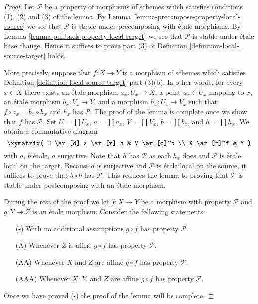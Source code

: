 \begin{proof}
Let $\mathcal{P}$ be a property of morphisms of schemes which
satisfies conditions (1), (2) and (3) of the lemma. By
Lemma \ref{lemma-precompose-property-local-source}
we see that $\mathcal{P}$ is stable under precomposing with
\'etale morphisms. By
Lemma \ref{lemma-pullback-property-local-target}
we see that $\mathcal{P}$ is stable under \'etale base change.
Hence it suffices to prove part (3) of
Definition \ref{definition-local-source-target}
holds.

\medskip\noindent
More precisely, suppose that $f : X \to Y$ is a morphism
of schemes which satisfies
Definition \ref{definition-local-source-target} part (3)(b).
In other words, for every $x \in X$ there exists an \'etale
morphism $a_x : U_x \to X$, a point $u_x \in U_x$ mapping to $x$,
an \'etale morphism $b_x : V_x \to Y$, and a morphism $h_x : U_x \to V_x$
such that $f \circ a_x = b_x \circ h_x$ and $h_x$ has $\mathcal{P}$.
The proof of the lemma is complete once we show that $f$ has $\mathcal{P}$.
Set $U = \coprod U_x$, $a = \coprod a_x$, $V = \coprod V_x$,
$b = \coprod b_x$, and $h = \coprod h_x$. We obtain a
commutative diagram
$$
\xymatrix{
U \ar[d]_a \ar[r]_h & V \ar[d]^b \\
X \ar[r]^f & Y
}
$$
with $a$, $b$ \'etale, $a$ surjective. Note that $h$ has $\mathcal{P}$
as each $h_x$ does and $\mathcal{P}$ is \'etale local on the target.
Because $a$ is surjective and $\mathcal{P}$ is \'etale local on the source,
it suffices to prove that $b \circ h$ has $\mathcal{P}$.
This reduces the lemma to proving that $\mathcal{P}$ is stable under
postcomposing with an \'etale morphism.

\medskip\noindent
During the rest of the proof we let $f : X \to Y$ be a
morphism with property $\mathcal{P}$ and $g : Y \to Z$ is an \'etale
morphism. Consider the following statements:
\begin{enumerate}
\item[(-)] With no additional assumptions $g \circ f$
has property $\mathcal{P}$.
\item[(A)] Whenever $Z$ is affine
$g \circ f$ has property $\mathcal{P}$.
\item[(AA)] Whenever $X$ and $Z$ are affine
$g \circ f$ has property $\mathcal{P}$.
\item[(AAA)] Whenever $X$, $Y$, and $Z$ are affine
$g \circ f$ has property $\mathcal{P}$.
\end{enumerate}
Once we have proved (-) the proof of the lemma will be complete.


\end{proof}
